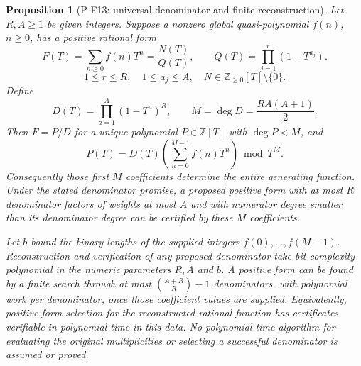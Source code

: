 \documentclass[11pt,a4paper]{article}
\newtheorem{proposition}{Proposition}[section]
\begin{document}
\begin{proposition}[P-F13: universal denominator and finite reconstruction]
\label{prop:finiteprefix}
Let $R,A\ge1$ be given integers. Suppose a nonzero global
quasi-polynomial $f(n)$, $n\ge0$, has a positive rational form
\[
 F(T)=\sum_{n\ge0}f(n)T^n
 =\frac{N(T)}{Q(T)},\qquad
 Q(T)=\prod_{j=1}^{r}(1-T^{a_j}).
\]
\[
 1\le r\le R,\quad 1\le a_j\le A,
 \quad N\in\mathbb Z_{\ge0}[T]\setminus\{0\}.
\]
Define
\[
 D(T)=\prod_{a=1}^{A}(1-T^a)^R,
 \qquad M=\deg D=\frac{RA(A+1)}2.
\]
Then $F=P/D$ for a unique polynomial $P\in\mathbb Z[T]$ with
$\deg P<M$, and
\[
 P(T)=D(T)\left(\sum_{n=0}^{M-1}f(n)T^n\right)\bmod T^M.
 \tag{P-F13a}
\]
Consequently those first $M$ coefficients determine the entire
generating function. Under the stated denominator promise, a proposed
positive form with at most $R$ denominator factors of weights at most
$A$ and with numerator degree smaller than its denominator degree can
be certified by these $M$ coefficients.

Let $b$ bound the binary lengths of the supplied integers
$f(0),\ldots,f(M-1)$. Reconstruction and verification of any proposed
denominator take bit complexity polynomial in the numeric parameters
$R,A$ and $b$. A positive form can be found by a finite search through
at most $\binom{A+R}{R}-1$ denominators, with polynomial work per
denominator, once those coefficient values are supplied.
Equivalently, positive-form selection for the reconstructed rational
function has certificates verifiable in polynomial time in this data.
No polynomial-time algorithm for evaluating the original multiplicities
or selecting a successful denominator is assumed or proved.
\end{proposition}
\end{document}
